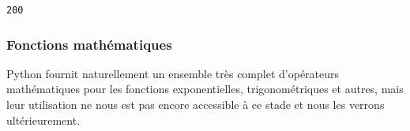     \begin{Verbatim}[commandchars=\\\{\},frame=single,framerule=0.3mm,rulecolor=\color{cellframecolor}]
200
\end{Verbatim}

    \hypertarget{fonctions-mathuxe9matiques}{%
\subsubsection{Fonctions
mathématiques}\label{fonctions-mathuxe9matiques}}

    Python fournit naturellement un ensemble très complet d'opérateurs
mathématiques pour les fonctions exponentielles, trigonométriques et
autres, mais leur utilisation ne nous est pas encore accessible à ce
stade et nous les verrons ultérieurement.


    
    
    

